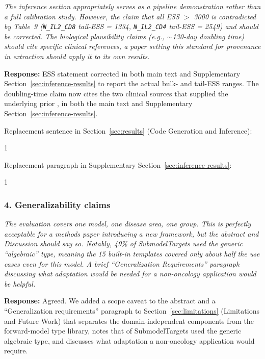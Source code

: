 \documentclass[11pt]{article}
\newcommand{\reviewer}[1]{\textcolor{reviewercolor}{\textit{#1}}}
\newcommand{\response}[1]{\textcolor{responsecolor}{\textbf{Response:} #1}}
\providecommand{\trackchanges}{1}
\newenvironment{revised}{\if1\trackchanges\color{blue}\fi}{}
\begin{document}
\reviewer{The inference section appropriately serves as a pipeline demonstration rather than a full calibration study. However, the claim that all ESS $>$ 3000 is contradicted by Table~9 (\texttt{N\_IL2\_CD8} tail-ESS = 1334, \texttt{N\_IL2\_CD4} tail-ESS = 2549) and should be corrected. The biological plausibility claims (e.g., $\sim$130-day doubling time) should cite specific clinical references, a paper setting this standard for provenance in extraction should apply it to its own results.}

\response{ESS statement corrected in both main text and Supplementary Section~\ref{sec:inference-results} to report the actual bulk- and tail-ESS ranges. The doubling-time claim now cites the two clinical sources that supplied the underlying prior \citep{ahnTimeProgressionPancreatic2017, jangMissedPancreaticDuctal2015}, in both the main text and Supplementary Section~\ref{sec:inference-results}.}

\medskip

Replacement sentence in Section~\ref{sec:results} (Code Generation and Inference):

\begin{revised}

\end{revised}

\medskip

Replacement paragraph in Supplementary Section~\ref{sec:inference-results}:

\begin{revised}

\end{revised}

\bigskip

\subsubsection*{4. Generalizability claims}

\reviewer{The evaluation covers one model, one disease area, one group. This is perfectly acceptable for a methods paper introducing a new framework, but the abstract and Discussion should say so. Notably, 49\% of SubmodelTargets used the generic ``algebraic'' type, meaning the 15 built-in templates covered only about half the use cases even for this model. A brief ``Generalization Requirements'' paragraph discussing what adaptation would be needed for a non-oncology application would be helpful.}

\response{Agreed. We added a scope caveat to the abstract and a ``Generalization requirements'' paragraph to Section~\ref{sec:limitations} (Limitations and Future Work) that separates the domain-independent components from the forward-model type library, notes that \mtAlgebraicPct{} of SubmodelTargets used the generic algebraic type, and discusses what adaptation a non-oncology application would require.}
\end{document}
